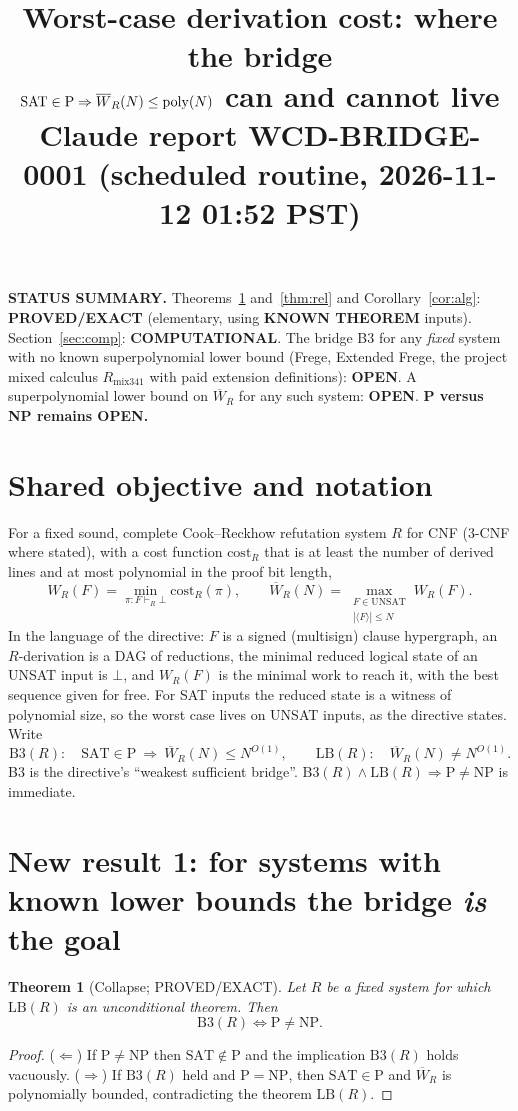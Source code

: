 \documentclass[11pt]{article}
\title{Worst-case derivation cost: where the bridge\\ $\mathrm{SAT}\in\mathrm{P}\Rightarrow \Wbar_R(N)\le\mathrm{poly}(N)$ can and cannot live\\[4pt]\large Claude report WCD-BRIDGE-0001 (scheduled routine, 2026-11-12 01:52 PST)}
\date{}
\newtheorem{theorem}{Theorem}
\theoremstyle{definition}
\newcommand{\Wbar}{\overline W}
\begin{document}
\maketitle

\noindent\textbf{STATUS SUMMARY.} Theorems~\ref{thm:collapse} and~\ref{thm:rel} and Corollary~\ref{cor:alg}: \textbf{PROVED/EXACT} (elementary, using \textbf{KNOWN THEOREM} inputs). Section~\ref{sec:comp}: \textbf{COMPUTATIONAL}. The bridge B3 for any \emph{fixed} system with no known superpolynomial lower bound (Frege, Extended Frege, the project mixed calculus $R_{\mathrm{mix341}}$ with paid extension definitions): \textbf{OPEN}. A superpolynomial lower bound on $\Wbar_R$ for any such system: \textbf{OPEN}. \textbf{P versus NP remains OPEN.}

\section{Shared objective and notation}
For a fixed sound, complete Cook--Reckhow refutation system $R$ for CNF (3-CNF where stated), with a cost function $\mathrm{cost}_R$ that is at least the number of derived lines and at most polynomial in the proof bit length,
\[
W_R(F)=\min_{\pi:F\vdash_R\bot}\mathrm{cost}_R(\pi),\qquad
\Wbar_R(N)=\max_{\substack{F\in\mathrm{UNSAT}\\ |\langle F\rangle|\le N}} W_R(F).
\]
In the language of the directive: $F$ is a signed (multisign) clause hypergraph, an $R$-derivation is a DAG of reductions, the minimal reduced logical state of an UNSAT input is $\bot$, and $W_R(F)$ is the minimal work to reach it, with the best sequence given for free. For SAT inputs the reduced state is a witness of polynomial size, so the worst case lives on UNSAT inputs, as the directive states. Write
\[
\mathrm{B3}(R):\quad \mathrm{SAT}\in\mathrm{P}\ \Longrightarrow\ \Wbar_R(N)\le N^{O(1)},\qquad
\mathrm{LB}(R):\quad \Wbar_R(N)\ne N^{O(1)}.
\]
B3 is the directive's ``weakest sufficient bridge''. $\mathrm{B3}(R)\wedge\mathrm{LB}(R)\Rightarrow \mathrm{P}\ne\mathrm{NP}$ is immediate.

\section{New result 1: for systems with known lower bounds the bridge \emph{is} the goal}

\begin{theorem}[Collapse; PROVED/EXACT]\label{thm:collapse}
Let $R$ be a fixed system for which $\mathrm{LB}(R)$ is an unconditional theorem. Then
\[
\mathrm{B3}(R)\iff \mathrm{P}\ne\mathrm{NP}.
\]
\end{theorem}
\begin{proof}
($\Leftarrow$) If $\mathrm{P}\ne\mathrm{NP}$ then $\mathrm{SAT}\notin\mathrm{P}$ and the implication $\mathrm{B3}(R)$ holds vacuously.
($\Rightarrow$) If $\mathrm{B3}(R)$ held and $\mathrm{P}=\mathrm{NP}$, then $\mathrm{SAT}\in\mathrm{P}$ and $\Wbar_R$ is polynomially bounded, contradicting the theorem $\mathrm{LB}(R)$.
\end{proof}
\end{document}
